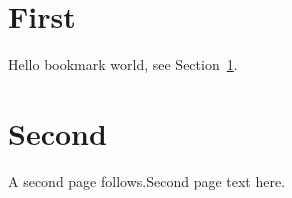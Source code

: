 \documentclass{article}
\begin{document}
\section{First}\label{sec:first}
Hello bookmark world, see Section~\ref{sec:first}.
\section{Second}
A second page follows.\newpage Second page text here.
\end{document}
